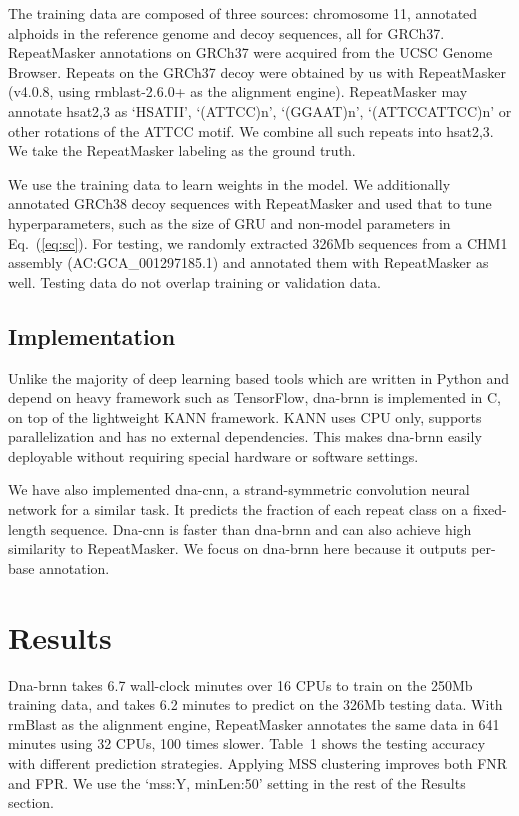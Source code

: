 \documentclass{bioinfo}
\begin{document}
\begin{methods}
The training data are composed of three sources: chromosome 11, annotated
alphoids in the reference genome and decoy sequences, all for GRCh37.
RepeatMasker annotations on GRCh37 were acquired from the UCSC Genome Browser.
Repeats on the GRCh37 decoy were obtained by us with RepeatMasker (v4.0.8,
using rmblast-2.6.0+ as the alignment engine). RepeatMasker may annotate
hsat2,3 as `HSATII', `(ATTCC)n', `(GGAAT)n', `(ATTCCATTCC)n' or other rotations
of the ATTCC motif. We combine all such repeats into hsat2,3.  We take the
RepeatMasker labeling as the ground truth.

We use the training data to learn weights in the model. We additionally
annotated GRCh38 decoy sequences with RepeatMasker and used that to tune
hyperparameters, such as the size of GRU and non-model parameters in
Eq.~(\ref{eq:sc}). For testing, we randomly extracted 326Mb sequences from a
CHM1 assembly (AC:GCA\_001297185.1) and annotated them with RepeatMasker as
well. Testing data do not overlap training or validation data.

\subsection{Implementation}

Unlike the majority of deep learning based tools which are written in Python
and depend on heavy framework such as TensorFlow, dna-brnn is implemented in C,
on top of the lightweight KANN framework. KANN uses CPU only, supports
parallelization and has no external dependencies. This makes dna-brnn easily
deployable without requiring special hardware or software settings.

We have also implemented dna-cnn, a strand-symmetric convolution neural network
for a similar task. It predicts the fraction of each repeat class on a
fixed-length sequence. Dna-cnn is faster than dna-brnn and can also achieve
high similarity to RepeatMasker. We focus on dna-brnn here because it outputs
per-base annotation.

\end{methods}

\section{Results}

Dna-brnn takes 6.7 wall-clock minutes over 16 CPUs to train on the 250Mb
training data, and takes 6.2 minutes to predict on the 326Mb testing data.
With rmBlast as the alignment engine, RepeatMasker annotates the same data in
641 minutes using 32 CPUs, 100 times slower. Table~1 shows the testing accuracy
with different prediction strategies. Applying MSS clustering improves both FNR
and FPR. We use the `mss:Y, minLen:50' setting in the rest of the Results
section.
\end{document}
